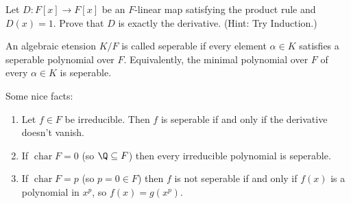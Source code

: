 \begin{exercise}
Let $D\colon F[x] \to F[x]$ be an $F$-linear map satisfying the product rule and $D(x) = 1$. Prove that $D$ is exactly the derivative. (Hint: Try Induction.)
\end{exercise}

\begin{definition}
An algebraic etension $K/F$ is called seperable if every element $\alpha \in K$ satisfies a seperable polynomial over $F$. Equivalently, the minimal polynomial over $F$ of every $\alpha \in K$ is seperable.
\end{definition}

\begin{proposition} Some nice facts:
\begin{enumerate}
\item Let $f \in F$ be irreducible. Then $f$ is seperable if and only if the derivative doesn't vanish.
\item If $\operatorname{char} F = 0$ (so $\Q \subseteq F$) then every irreducible polynomial is seperable.
\item If $\operatorname{char} F = p$ (so $p=0 \in F$) then $f$ is not seperable if and only if $f(x)$ is a polynomial in $x^p$, so $f(x) = g(x^p)$.
\end{enumerate}
\end{proposition}